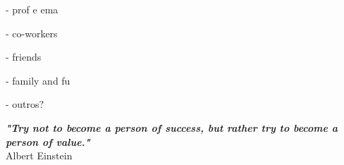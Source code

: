 \thispagestyle{empty}

\begin{acknowledgments} 

\par - prof e ema
\par - co-workers
\par - friends
\par - family and fu
\par - outros?


\end{acknowledgments}

\hbox{} \vfill
\begin{flushright}
\small \textit{\textbf{"Try not to become a person of success, but rather try to become a person of value."}} %
\\ \vspace{2mm}  
\scriptsize Albert Einstein
\end{flushright}

\clearpage
\thispagestyle{empty}
\cleardoublepage